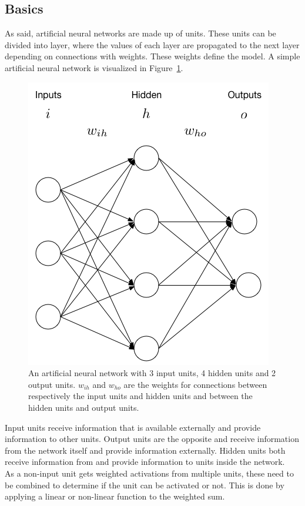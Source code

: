 \subsection{Basics} %
\label{sub:basics}
As said, artificial neural networks are made up of units. These units can be divided into layer, where the values of each layer are propagated to the next layer depending on connections with weights. These weights define the model. A simple artificial neural network is visualized in Figure~\ref{fig:ann}.
\begin{figure}[htb]
    \centering
    \includegraphics[width=.7\linewidth]{images/ann.png}
    \caption[An artificial neural network]{An artificial neural network with 3 input units, 4 hidden units and 2 output units. $w_{ih}$ and $w_{ho}$ are the weights for connections between respectively the input units and hidden units and between the hidden units and output units.}
    \label{fig:ann}
\end{figure}
Input units receive information that is available externally and provide information to other units. Output units are the opposite and receive information from the network itself and provide information externally. Hidden units both receive information from and provide information to units inside the network.\\
As a non-input unit gets weighted activations from multiple units, these need to be combined to determine if the unit can be activated or not. This is done by applying a linear or non-linear function to the weighted sum.

